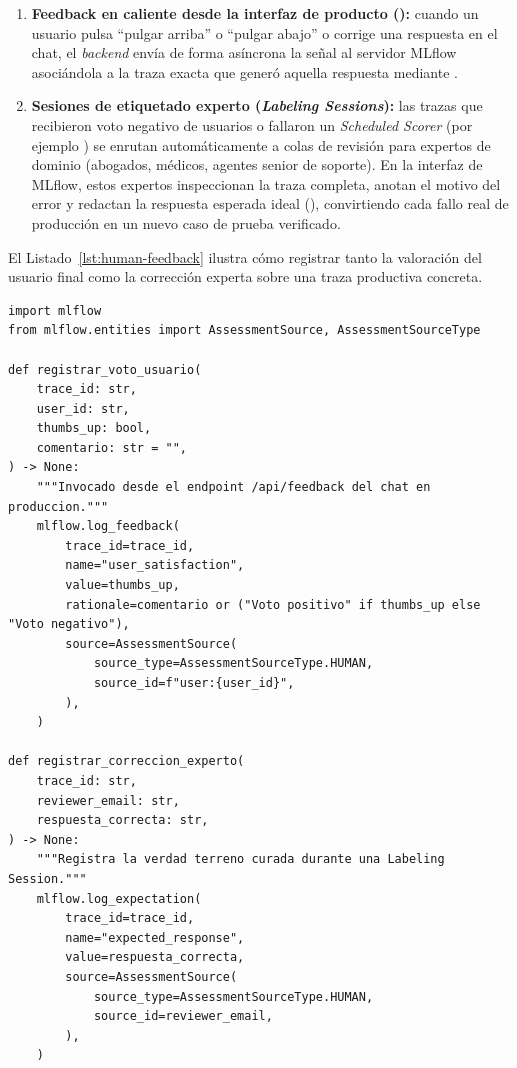 \begin{enumerate}
  \item \textbf{Feedback en caliente desde la interfaz de producto ():} cuando un usuario pulsa ``pulgar arriba'' o ``pulgar abajo'' o corrige una respuesta en el chat, el \textit{backend} envía de forma asíncrona la señal al servidor MLflow asociándola a la traza exacta que generó aquella respuesta mediante .
  \item \textbf{Sesiones de etiquetado experto (\textit{Labeling Sessions}):} las trazas que recibieron voto negativo de usuarios o fallaron un \textit{Scheduled Scorer} (por ejemplo ) se enrutan automáticamente a colas de revisión para expertos de dominio (abogados, médicos, agentes senior de soporte). En la interfaz de MLflow, estos expertos inspeccionan la traza completa, anotan el motivo del error y redactan la respuesta esperada ideal (), convirtiendo cada fallo real de producción en un nuevo caso de prueba verificado.
\end{enumerate}

El Listado~\ref{lst:human-feedback} ilustra cómo registrar tanto la valoración del usuario final como la corrección experta sobre una traza productiva concreta.

\begin{lstlisting}[style=python, caption={Registro de retroalimentación humana y verdad terreno experta vinculadas a trazas de producción con \code{mlflow.log\_feedback} y \code{mlflow.log\_expectation}.}, label={lst:human-feedback}]
import mlflow
from mlflow.entities import AssessmentSource, AssessmentSourceType

def registrar_voto_usuario(
    trace_id: str,
    user_id: str,
    thumbs_up: bool,
    comentario: str = "",
) -> None:
    """Invocado desde el endpoint /api/feedback del chat en produccion."""
    mlflow.log_feedback(
        trace_id=trace_id,
        name="user_satisfaction",
        value=thumbs_up,
        rationale=comentario or ("Voto positivo" if thumbs_up else "Voto negativo"),
        source=AssessmentSource(
            source_type=AssessmentSourceType.HUMAN,
            source_id=f"user:{user_id}",
        ),
    )

def registrar_correccion_experto(
    trace_id: str,
    reviewer_email: str,
    respuesta_correcta: str,
) -> None:
    """Registra la verdad terreno curada durante una Labeling Session."""
    mlflow.log_expectation(
        trace_id=trace_id,
        name="expected_response",
        value=respuesta_correcta,
        source=AssessmentSource(
            source_type=AssessmentSourceType.HUMAN,
            source_id=reviewer_email,
        ),
    )
\end{lstlisting}

